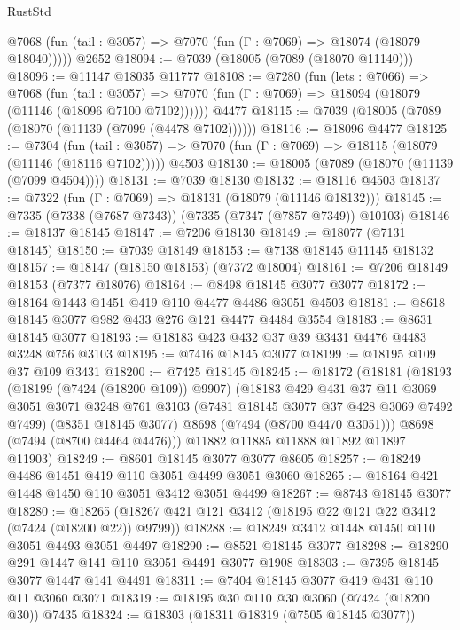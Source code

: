 \begin{lexlean}{RustStd}
\begin{coremodule}
      @7068 (fun (tail : @3057) => @7070 (fun (Γ : @7069) => @18074 (@18079 @18040)))))
    @2652
@18094 := @7039 (@18005 (@7089 (@18070 @11140)))
@18096 := @11147 @18035 @11777
@18108 := @7280
    (fun (lets : @7066) =>
    @7068
      (fun (tail : @3057) =>
      @7070 (fun (Γ : @7069) => @18094 (@18079 (@11146 (@18096 @7100 @7102))))))
    @4477
@18115 := @7039 (@18005 (@7089 (@18070 (@11139 (@7099 (@4478 @7102))))))
@18116 := @18096 @4477
@18125 := @7304
    (fun (tail : @3057) => @7070 (fun (Γ : @7069) => @18115 (@18079 (@11146 (@18116 @7102)))))
    @4503
@18130 := @18005 (@7089 (@18070 (@11139 (@7099 @4504))))
@18131 := @7039 @18130
@18132 := @18116 @4503
@18137 := @7322 (fun (Γ : @7069) => @18131 (@18079 (@11146 @18132)))
@18145 := @7335 (@7338 (@7687 @7343)) (@7335 (@7347 (@7857 @7349)) @10103)
@18146 := @18137 @18145
@18147 := @7206 @18130
@18149 := @18077 (@7131 @18145)
@18150 := @7039 @18149
@18153 := @7138 @18145 @11145 @18132
@18157 := @18147 (@18150 @18153) (@7372 @18004)
@18161 := @7206 @18149 @18153 (@7377 @18076)
@18164 := @8498 @18145 @3077 @3077
@18172 := @18164 @1443 @1451 @419 @110 @4477 @4486 @3051 @4503
@18181 := @8618 @18145 @3077 @982 @433 @276 @121 @4477 @4484 @3554
@18183 := @8631 @18145 @3077
@18193 := @18183 @423 @432 @37 @39 @3431 @4476 @4483 @3248 @756 @3103
@18195 := @7416 @18145 @3077
@18199 := @18195 @109 @37 @109 @3431
@18200 := @7425 @18145
@18245 := @18172
    (@18181
      (@18193
        (@18199 (@7424 (@18200 @109)) @9907)
        (@18183
          @429
          @431
          @37
          @11
          @3069
          @3051
          @3071
          @3248
          @761
          @3103
          (@7481 @18145 @3077 @37 @428 @3069 @7492 @7499)
          (@8351 @18145 @3077)
          @8698
          (@7494 (@8700 @4470 @3051)))
        @8698
        (@7494 (@8700 @4464 @4476)))
      @11882
      @11885
      @11888
      @11892
      @11897
      @11903)
@18249 := @8601 @18145 @3077 @3077 @8605
@18257 := @18249 @4486 @1451 @419 @110 @3051 @4499 @3051 @3060
@18265 := @18164 @421 @1448 @1450 @110 @3051 @3412 @3051 @4499
@18267 := @8743 @18145 @3077
@18280 := @18265 (@18267 @421 @121 @3412 (@18195 @22 @121 @22 @3412 (@7424 (@18200 @22)) @9799))
@18288 := @18249 @3412 @1448 @1450 @110 @3051 @4493 @3051 @4497
@18290 := @8521 @18145 @3077
@18298 := @18290 @291 @1447 @141 @110 @3051 @4491 @3077 @1908
@18303 := @7395 @18145 @3077 @1447 @141 @4491
@18311 := @7404 @18145 @3077 @419 @431 @110 @11 @3060 @3071
@18319 := @18195 @30 @110 @30 @3060 (@7424 (@18200 @30)) @7435
@18324 := @18303 (@18311 @18319 (@7505 @18145 @3077))

\end{coremodule}
\end{lexlean}

